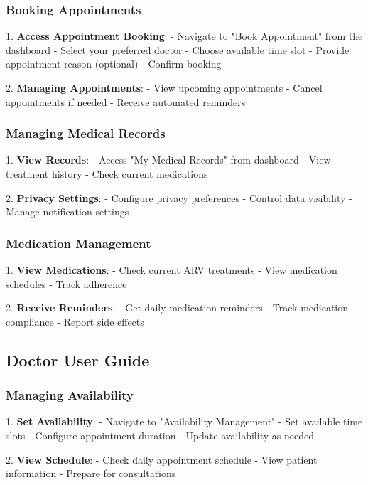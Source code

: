 \documentclass[12pt,a4paper]{article}
\begin{document}
\subsubsection{Booking Appointments}

1. \textbf{Access Appointment Booking}:
   - Navigate to "Book Appointment" from the dashboard
   - Select your preferred doctor
   - Choose available time slot
   - Provide appointment reason (optional)
   - Confirm booking

2. \textbf{Managing Appointments}:
   - View upcoming appointments
   - Cancel appointments if needed
   - Receive automated reminders

\subsubsection{Managing Medical Records}

1. \textbf{View Records}:
   - Access "My Medical Records" from dashboard
   - View treatment history
   - Check current medications

2. \textbf{Privacy Settings}:
   - Configure privacy preferences
   - Control data visibility
   - Manage notification settings

\subsubsection{Medication Management}

1. \textbf{View Medications}:
   - Check current ARV treatments
   - View medication schedules
   - Track adherence

2. \textbf{Receive Reminders}:
   - Get daily medication reminders
   - Track medication compliance
   - Report side effects

\subsection{Doctor User Guide}

\subsubsection{Managing Availability}

1. \textbf{Set Availability}:
   - Navigate to "Availability Management"
   - Set available time slots
   - Configure appointment duration
   - Update availability as needed

2. \textbf{View Schedule}:
   - Check daily appointment schedule
   - View patient information
   - Prepare for consultations
\end{document}
